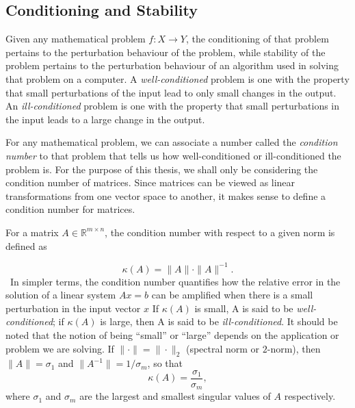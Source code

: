 \subsection{Conditioning and Stability}\label{sec:ConditioningAndStability}
Given any mathematical problem $f: X \rightarrow Y$, the conditioning of that problem pertains to the perturbation behaviour of the problem, while stability of the problem pertains to the perturbation behaviour of an algorithm used in solving that problem on a computer. A \textit{well-conditioned} problem is one with the property that small perturbations of the input lead to only small changes in the output. An \textit{ill-conditioned} problem is one with the property that small perturbations in the input leads to a large change in the output.

For any mathematical problem, we can associate a number called the \textit{condition number} to that problem that tells us how well-conditioned or ill-conditioned the problem is. For the purpose of this thesis, we shall only be considering the condition number of matrices. Since matrices can be viewed as linear transformations from one vector space to another, it makes sense to define a condition number for matrices.

For a matrix $A \in \mathbb{R}^{m\times n}$, the condition number with respect to a given norm is defined as

\[\kappa(A) = \|A\| \cdot \|A\|^{-1}.\]\
In simpler terms, the condition number quantifies how the relative error in the solution of a linear system $Ax = b$ can be amplified when there is a small perturbation in the input vector $x$ If $\kappa(A)$ is small, A is said to be \textit{well-conditioned}; if $\kappa(A)$ is large, then A is said to be \textit{ill-conditioned}. It should be noted that the notion of being ``small'' or ``large'' depends on the application or problem we are solving. If $\| \cdot\| = \| \cdot \|_2$ (spectral norm or $2$-norm), then $\|A\| = \sigma_1$ and $\| A^{-1} \| = 1/\sigma_m$, so that
\begin{equation}\label{eq:ConditionNumber}
	\kappa(A) = \frac{\sigma_1}{\sigma_m},
\end{equation}
where $\sigma_1$ and $\sigma_m$ are the largest and smallest singular values of $A$ respectively.

